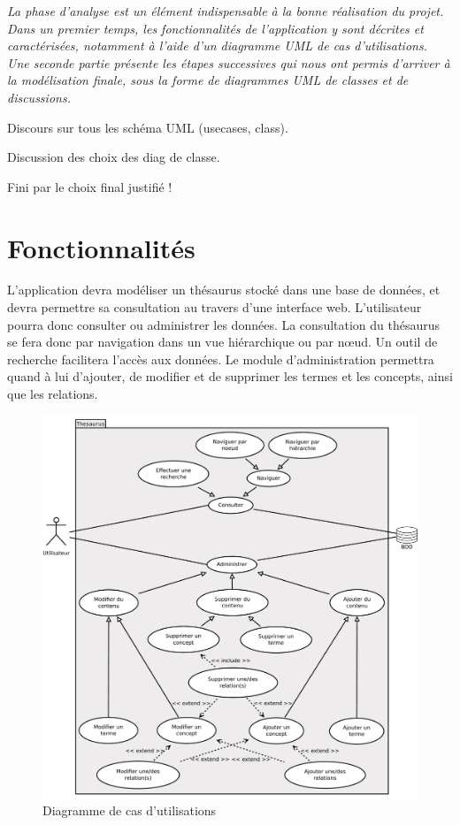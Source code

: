\textit{La phase d'analyse est un élément indispensable à la bonne réalisation du projet. Dans un premier temps, les fonctionnalités de l'application y sont décrites et caractérisées, notamment à l'aide d'un diagramme UML de cas d'utilisations. Une seconde partie présente les étapes successives qui nous ont permis d'arriver à la modélisation finale, sous la forme de diagrammes UML de classes et de \og{}discussions\fg{}.}

Discours sur tous les schéma UML (usecases, class).

Discussion des choix des diag de classe.

Fini par le choix final justifié !

\section{Fonctionnalités}

L'application devra modéliser un thésaurus stocké dans une base de données, et devra permettre sa consultation au travers d'une interface web. L'utilisateur pourra donc consulter ou administrer les données. La consultation du thésaurus se fera donc par navigation dans un vue hiérarchique ou par nœud. Un outil de recherche facilitera l'accès aux données. Le module d'administration permettra quand à lui d'ajouter, de modifier et de supprimer les termes et les concepts, ainsi que les relations.

\begin{figure}[H]
\includegraphics[width=\textwidth]{files/usecase}
\caption{Diagramme de cas d'utilisations}
\end{figure}

